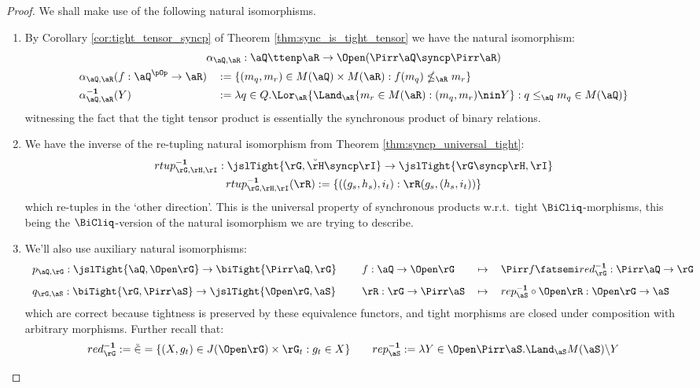\documentclass{article}
\begin{document}
\begin{proof}
We shall make use of the following natural isomorphisms.
\begin{enumerate}
\item
By Corollary \ref{cor:tight_tensor_syncp} of Theorem \ref{thm:sync_is_tight_tensor} we have the natural isomorphism:
\[
\begin{tabular}{c}
$\alpha_{\aQ,\aR} : \aQ \ttenp \aR \to \Open(\Pirr\aQ \syncp \Pirr\aR)$
\\[1ex]
\begin{tabular}{ll}
$\alpha_{\aQ,\aR}(f : \aQ^{\pOp} \to \aR)$
& $ := \{ (m_q,m_r) \in M(\aQ) \times M(\aR) : f(m_q) \nleq_\aR m_r \}$
\\[1ex]
$\alpha_{\aQ,\aR}^{\bf-1}(Y)$
& $ := \lambda q \in Q.\Lor_\aR \{ \Land_\aR \{ m_r \in M(\aR) : (m_q,m_r) \nin Y  \} :  q \leq_\aQ m_q \in M(\aQ) \} $
\end{tabular}
\end{tabular}
\]
witnessing the fact that the tight tensor product is essentially the synchronous product of binary relations.

\item
We have the inverse of the re-tupling natural isomorphism from Theorem \ref{thm:syncp_universal_tight}:
\[
\begin{tabular}{c}
$rtup_{\rG,\rH,\rI}^{\bf-1} : \jslTight{\rG,\breve{\rH} \syncp \rI} \to \jslTight{\rG \syncp \rH, \rI}$
\\[1ex]
$rtup_{\rG,\rH,\rI}^{\bf-1}(\rR) := \{ ((g_s,h_s),i_t) : \rR(g_s,(h_s,i_t)) \}$
\end{tabular}
\]
which re-tuples in the `other direction'. This is the universal property of synchronous products w.r.t.\ tight $\BiCliq$-morphisms, this being the $\BiCliq$-version of the natural isomorphism we are trying to describe.

\item
We'll also use auxiliary natural isomorphisms:
\[
\begin{tabular}{lllll}
$p_{\aQ,\rG} : \jslTight{\aQ,\Open\rG} \to \biTight{\Pirr\aQ,\rG}$
&&
$f : \aQ \to \Open\rG$ & $\mapsto$ & $\Pirr f \fatsemi red_\rG^{\bf-1} : \Pirr\aQ \to \rG$
\\[2ex]
$q_{\rG,\aS} : \biTight{\rG,\Pirr\aS} \to \jslTight{\Open\rG,\aS}$
&&
$\rR : \rG \to \Pirr\aS$ & $\mapsto$ & $rep_\aS^{\bf-1} \circ \Open\rR : \Open\rG \to \aS$
\end{tabular}
\]
which are correct because tightness is preserved by these equivalence functors, and tight morphisms are closed under composition with arbitrary morphisms. Further recall that:
\[
red_\rG^{\bf-1} := \breve{\in} = \{ (X,g_t) \in J(\Open\rG) \times \rG_t : g_t \in X \}
\qquad
rep_\aS^{\bf-1} := \lambda Y \in \Open\Pirr\aS. \Land_\aS M(\aS) \backslash Y
\]
\end{enumerate}


\end{proof}
\end{document}
